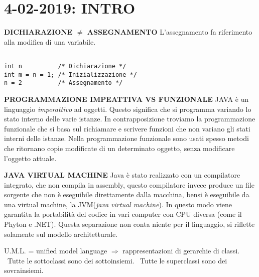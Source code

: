 

\newpage
\section{4-02-2019: INTRO}
\textbf{DICHIARAZIONE $\neq$ ASSEGNAMENTO} \newline
L'assegnamento fa riferimento alla modifica di una variabile.
\begin{lstlisting}[basicstyle=\small,]

int n		   /* Dichiarazione */
int m = n = 1; /* Inizializzazione */
n = 2 		   /* Assegnamento */

\end{lstlisting}

\noindent \textbf{PROGRAMMAZIONE IMPEATTIVA VS FUNZIONALE} \newline
JAVA è un linguaggio \textit{imperattivo} ad oggetti. Questo significa che si programma variando lo stato interno delle varie istanze. In contrapposizione troviamo la programmazione funzionale che si basa sul richiamare e scrivere funzioni che non variano gli stati interni delle istanze. Nella programmazione funzionale sono usati spesso metodi che ritornano copie modificate di un determinato oggetto, senza modificare l'oggetto attuale.

\noindent \textbf{JAVA VIRTUAL MACHINE} \newline
\noindent Java è stato realizzato con un compilatore integrato, che non compila in assembly, questo compilatore invece produce un file sorgente che non è eseguibile direttamente dalla macchina, bensi è eseguibile da una virtual machine, la JVM(\textit{java virtual machine}). In questo modo viene garantita la portabilità del codice in vari computer con CPU diversa (come il Phyton e .NET). \newline
Questa separazione non conta niente per il linguaggio, si riflette solamente sul modello architetturale.

\noindent U.M.L. = unified model language $\Rightarrow$ rappresentazioni di gerarchie di classi. \newline
{} \newline
\textbullet\ Tutte le sottoclassi sono dei sottoinsiemi. \newline
\textbullet\ Tutte le superclassi sono dei sovrainsiemi. 

